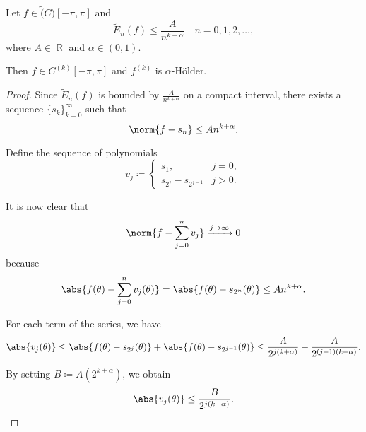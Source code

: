 \begin{theorem}\label{thm:bernsteins_trigonometric_theorem}
  Let \( f \in \tilde(C)[-\pi, \pi] \) and
  \begin{equation*}
    \tilde{E}_n(f) \leq \frac A {n^{k+\alpha}} \quad n = 0, 1, 2, \ldots,
  \end{equation*}
  where \( A \in \BbbR \) and \( \alpha \in (0, 1) \).

  Then \( f \in C^{(k)}[-\pi, \pi] \) and \( f^{(k)} \) is \( \alpha \)-H\"older.
\end{theorem}
\begin{proof}
  Since \( \tilde{E}_n(f) \) is bounded by \( \frac A {n^{k+\alpha}} \) on a compact interval, there exists a sequence \( \{ s_k \}_{k=0}^\infty \) such that
  \begin{equation*}
    \norm{f - s_n} \leq A {n^{k+\alpha}}.
  \end{equation*}

  Define the sequence of polynomials
  \begin{equation*}
    v_j \coloneqq \begin{cases}
      s_1,                  &j = 0, \\
      s_{2^j} - s_{2^{j-1}} &j > 0.
    \end{cases}
  \end{equation*}

  It is now clear that
  \begin{equation*}
    \norm{f - \sum_{j=0}^n v_j} \xrightarrow[]{j \to \infty} 0
  \end{equation*}
  because
  \begin{equation*}
    \abs{f(\theta) - \sum_{j=0}^n v_j (\theta)}
    =
    \abs{f(\theta) - s_{2^n}(\theta)}
    \leq
    A {n^{k+\alpha}}.
  \end{equation*}

  For each term of the series, we have
  \begin{equation*}
    \abs{v_j(\theta)}
    \leq
    \abs{f(\theta) - s_{2^j}(\theta)} + \abs{f(\theta) - s_{2^{j-1}}(\theta)}
    \leq
    \frac A {2^{j(k + \alpha)}} + \frac A {2^{(j - 1) (k + \alpha)}}.
  \end{equation*}

  By setting \( B \coloneqq A (2^{k + \alpha}) \), we obtain
  \begin{equation*}
    \abs{v_j(\theta)} \leq \frac B {2^{j(k + \alpha)}}.
  \end{equation*}


\end{proof}
